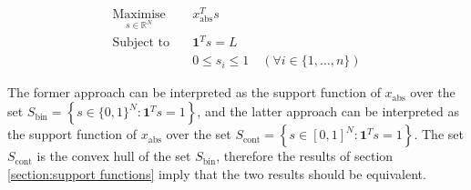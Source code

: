 \begin{align*}
    \underset{s\in\mathbb{R}^N}{\text{Maximise}} \quad & x_\text{abs}^T s \\
    \text{Subject to} \quad & \mathbf{1}^Ts = L \\
    & 0 \le s_i \le 1 \quad (\forall i\in\{1, \hdots, n\})
\end{align*}

The former approach can be interpreted as the support function of $x_\text{abs}$ over the set $S_\text{bin} = \left\{ s\in\{0,1\}^N:\mathbf{1}^T s = 1 \right\}$, and the latter approach can be interpreted as the support function of $x_\text{abs}$ over the set $S_\text{cont} = \left\{ s\in[0,1]^N:\mathbf{1}^T s = 1 \right\}$. The set $S_\text{cont}$ is the convex hull of the set $S_\text{bin}$, therefore the results of section \ref{section:support functions} imply that the two results should be equivalent.
